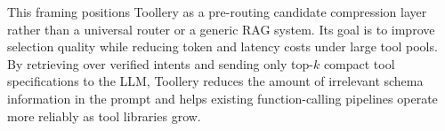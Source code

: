 This framing positions Toollery as a pre-routing candidate compression layer rather than a universal router or a generic RAG system. Its goal is to improve selection quality while reducing token and latency costs under large tool pools. By retrieving over verified intents and sending only top-$k$ compact tool specifications to the LLM, Toollery reduces the amount of irrelevant schema information in the prompt and helps existing function-calling pipelines operate more reliably as tool libraries grow.
